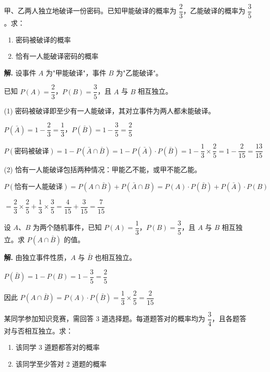 \documentclass[11pt]{ctexrep}
\begin{document}
\begin{example}[独立事件的概率计算]
    甲、乙两人独立地破译一份密码。已知甲能破译的概率为 $\dfrac{2}{3}$，乙能破译的概率为 $\dfrac{3}{5}$。求：
    \begin{enumerate}
        \item 密码被破译的概率
        \item 恰有一人能破译密码的概率
    \end{enumerate}
\end{example}

\textbf{解.} 设事件 $A$ 为"甲能破译"，事件 $B$ 为"乙能破译"。

已知 $P(A) = \dfrac{2}{3}$，$P(B) = \dfrac{3}{5}$，且 $A$ 与 $B$ 相互独立。

(1) 密码被破译即至少有一人能破译，其对立事件为两人都未能破译。

$P(\bar{A}) = 1 - \dfrac{2}{3} = \dfrac{1}{3}$，$P(\bar{B}) = 1 - \dfrac{3}{5} = \dfrac{2}{5}$

$P(\text{密码被破译}) = 1 - P(\bar{A} \cap \bar{B}) = 1 - P(\bar{A}) \cdot P(\bar{B}) = 1 - \dfrac{1}{3} \times \dfrac{2}{5} = 1 - \dfrac{2}{15} = \dfrac{13}{15}$

(2) 恰有一人能破译包括两种情况：甲能乙不能，或甲不能乙能。

$P(\text{恰有一人能破译}) = P(A \cap \bar{B}) + P(\bar{A} \cap B) = P(A) \cdot P(\bar{B}) + P(\bar{A}) \cdot P(B)$

$= \dfrac{2}{3} \times \dfrac{2}{5} + \dfrac{1}{3} \times \dfrac{3}{5} = \dfrac{4}{15} + \dfrac{3}{15} = \dfrac{7}{15}$

\begin{realexam}[2025 上海高三二模]
    设 $A$、$B$ 为两个随机事件，已知 $P(A) = \dfrac{1}{3}$，$P(B) = \dfrac{3}{5}$，且 $A$ 与 $B$ 相互独立。求 $P(A \cap \bar{B})$ 的值。
\end{realexam}

\textbf{解.} 由独立事件性质，$A$ 与 $\bar{B}$ 也相互独立。

$P(\bar{B}) = 1 - P(B) = 1 - \dfrac{3}{5} = \dfrac{2}{5}$

因此 $P(A \cap \bar{B}) = P(A) \cdot P(\bar{B}) = \dfrac{1}{3} \times \dfrac{2}{5} = \dfrac{2}{15}$

\begin{realexam}[练习]
    某同学参加知识竞赛，需回答 $3$ 道选择题。每道题答对的概率均为 $\dfrac{3}{4}$，且各题答对与否相互独立。求：
    \begin{enumerate}
        \item 该同学 $3$ 道题都答对的概率
        \item 该同学至少答对 $2$ 道题的概率
    \end{enumerate}
\end{realexam}
\end{document}
